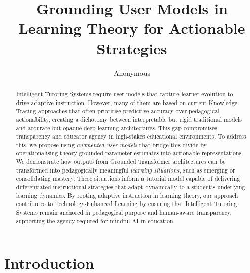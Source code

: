 \documentclass[runningheads]{llncs}
\begin{document}
%
\title{Grounding User Models in Learning Theory for Actionable Strategies}
%
\author{Anonymous}
%
\maketitle
%
\begin{abstract}
Intelligent Tutoring Systems require user models that capture learner evolution to drive adaptive instruction. However, many of them are based on current Knowledge Tracing approaches that often prioritise predictive accuracy over pedagogical actionability, creating a dichotomy between interpretable but rigid traditional models and accurate but opaque deep learning architectures. This gap compromises transparency and educator agency in high-stakes educational environments. To address this, we propose using \textit{augmented user models} that bridge this divide by operationalising theory-grounded parameter estimates into actionable representations. We demonstrate how outputs from Grounded Transformer architectures can be transformed into pedagogically meaningful \textit{learning situations}, such as emerging or consolidating mastery. These situations inform a tutorial model capable of delivering differentiated instructional strategies that adapt dynamically to a student's underlying learning dynamics. By rooting adaptive instruction in learning theory, our approach contributes to Technology-Enhanced Learning by ensuring that Intelligent Tutoring Systems remain anchored in pedagogical purpose and human-aware transparency, supporting the agency required for mindful AI in education.


\end{abstract}
%
%
\section{Introduction}
\end{document}
